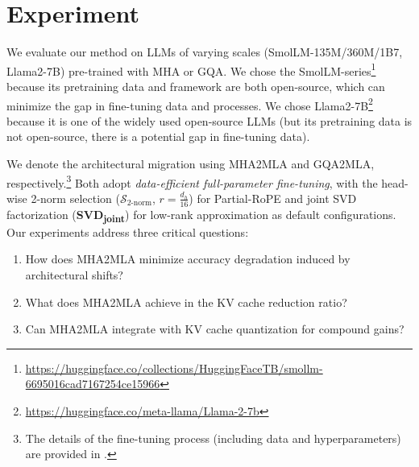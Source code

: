\section{Experiment}
\label{sec:exper}






We evaluate our method on LLMs of varying scales (SmolLM-135M/360M/1B7, Llama2-7B) pre-trained with MHA or GQA.
We chose the SmolLM-series\footnote{\url{https://huggingface.co/collections/HuggingFaceTB/smollm-6695016cad7167254ce15966}}
because its pretraining data and framework are both open-source, which can minimize the gap in fine-tuning data and processes. 
We chose Llama2-7B\footnote{\url{https://huggingface.co/meta-llama/Llama-2-7b}} because it is one of the widely used open-source LLMs (but its pretraining data is not open-source, there is a potential gap in fine-tuning data).

We denote the architectural migration using MHA2MLA and GQA2MLA, respectively.\footnote{
The details of the fine-tuning process (including data and hyperparameters) are provided in .
}
Both adopt \textit{data-efficient full-parameter fine-tuning}, with the head-wise 2-norm selection ($\mathcal{S}_{\text{2-norm}}$, $r=\frac{d_h}{16}$) for Partial-RoPE and joint SVD factorization (\textbf{SVD\textsubscript{joint}}) for low-rank approximation as default configurations. 
Our experiments address three critical questions:  
\begin{enumerate}[leftmargin=*,itemsep=0pt, topsep=0pt, parsep=0pt]
    \item How does MHA2MLA minimize accuracy degradation induced by architectural shifts? 
    \item What does MHA2MLA achieve in the KV cache reduction ratio?  
    \item Can MHA2MLA integrate with KV cache quantization for compound gains?  
\end{enumerate}  


